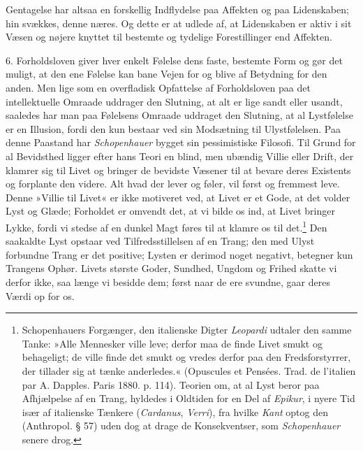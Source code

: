\documentclass[12pt,a4paper,openany]{book}
\newcommand{\opage}[1]{\marginnote{\footnotesize\textit{[#1]}}}
\begin{document}
Gentagelse har altsaa en forskellig Indflydelse paa Affekten og paa
Lidenskaben; hin svækkes, denne næres. Og dette er at udlede af, at
Lidenskaben er aktiv i sit Væsen og nøjere knyttet til bestemte og
tydelige Forestillinger end Affekten.

6. Forholdsloven giver hver enkelt Følelse dens faste, bestemte Form og
gør det muligt, at den ene Følelse kan bane Vejen for og blive af
Betydning for den anden. Men lige som en overfladisk Opfattelse af
Forholdsloven paa det intellektuelle Omraade uddrager den Slutning, at
alt er lige sandt eller usandt, saaledes har man paa Følelsens Omraade
uddraget den Slutning, at al Lystfølelse er en Illusion, fordi den kun
bestaar ved sin Modsætning til Ulystfølelsen. Paa denne Paastand har
\emph{Schopenhauer} bygget sin pessimistiske Filosofi. Til Grund for al
Bevidsthed ligger efter hans Teori en blind, men ubændig Villie eller
Drift, der klamrer sig til Livet og bringer de bevidste Væsener til at
bevare deres Existents og forplante den videre. Alt hvad der lever og
føler, vil først og fremmest leve. Denne »Villie til Livet« er ikke
motiveret ved, at Livet er et Gode, at det volder Lyst og Glæde;
Forholdet er omvendt det, at vi bilde os ind, at Livet bringer Lykke,
fordi vi stedse af en dunkel Magt føres til at klamre os til
det.\footnote[1]{Schopenhauers Forgænger, den italienske Digter
\emph{Leopardi} udtaler den samme Tanke: »Alle Mennesker ville leve;
derfor maa de finde Livet smukt og behageligt; de ville finde det smukt
og vredes derfor paa den Fredsforstyrrer, der tillader sig at tænke
anderledes.« (Opuscules et Pensées. Trad. de l’italien par A. Dapples.
Paris 1880. p. 114). Teorien om, at al Lyst beror paa Afhjælpelse af en
Trang, hyldedes i Oldtiden for en Del af \emph{Epikur}, i nyere Tid især
af italienske Tænkere (\emph{Cardanus}, \emph{Verri}), fra hvilke
\emph{Kant} optog den (Anthropol. § 57) uden dog at drage de
Konsekventser, som \emph{Schopenhauer} senere drog.} Den saakaldte Lyst
opstaar ved Tilfredsstillelsen af en Trang; den med Ulyst forbundne
Trang er det positive; Lysten er
\opage{337}derimod noget negativt, betegner kun Trangens Ophør. Livets
største Goder, Sundhed, Ungdom og Frihed skatte vi derfor ikke, saa
længe vi besidde dem; først naar de ere svundne, gaar deres Værdi op for
os.
\end{document}
